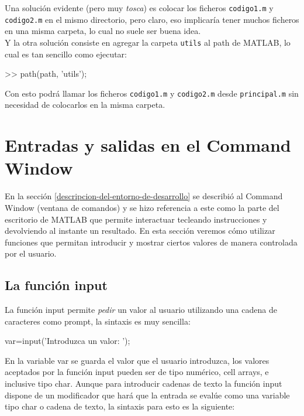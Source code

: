 Una solución evidente (pero muy \emph{tosca}) es colocar los ficheros
\texttt{codigo1.m} y \texttt{codigo2.m} en el mismo directorio, pero
claro, eso implicaría tener muchos ficheros en una misma carpeta, lo
cual no suele ser buena idea.\\

Y la otra solución consiste en agregar la carpeta \texttt{utils} al path
de MATLAB, lo cual es tan sencillo como ejecutar:

\begin{matlab}
>> path(path, 'utils');
\end{matlab}

Con esto podrá llamar los ficheros \texttt{codigo1.m} y
\texttt{codigo2.m} desde \texttt{principal.m} sin necesidad de
colocarlos en la misma carpeta.

\section{Entradas y salidas en el Command Window}\label{entradas-y-salidas-en-el-command-window}

En la sección \ref{descripcion-del-entorno-de-desarrollo} se describió al Command Window (ventana de comandos) y
se hizo referencia a este como la parte del escritorio de MATLAB que
permite interactuar tecleando instrucciones y devolviendo al instante un
resultado. En esta sección veremos cómo utilizar funciones que permitan
introducir y mostrar ciertos valores de manera controlada por el
usuario.

\subsection{La función input}\label{la-funcion-input}

La función input permite \emph{pedir} un valor al usuario utilizando una
cadena de caracteres como prompt, la sintaxis es muy sencilla:

\begin{matlab}
var=input('Introduzca un valor: ');
\end{matlab}

En la variable var se guarda el valor que el usuario introduzca, los
valores aceptados por la función input pueden ser de tipo numérico, cell
arrays, e inclusive tipo char. Aunque para introducir cadenas de texto
la función input dispone de un modificador que hará que la entrada se
evalúe como una variable tipo char o cadena de texto, la sintaxis para
esto es la siguiente:

